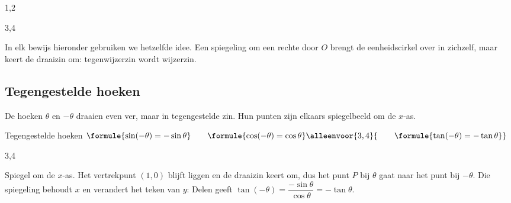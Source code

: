 \begin{alleenvoor}{1,2}
\end{alleenvoor}
\begin{alleenvoor}{3,4}

In elk bewijs hieronder gebruiken we hetzelfde idee. Een spiegeling om een rechte door $O$ brengt de eenheidscirkel over in zichzelf, maar keert de draaizin om: tegenwijzerzin wordt wijzerzin.
\end{alleenvoor}

\subsection{Tegengestelde hoeken}

De hoeken $\theta$ en $-\theta$ draaien even ver, maar in tegengestelde zin. Hun punten zijn elkaars spiegelbeeld om de $x$-as.

\begin{theorie}
\begin{stelling}{Tegengestelde hoeken}
\qquad $\formule{\sin(-\theta) = -\sin\theta} \qquad \formule{\cos(-\theta) = \cos\theta}\alleenvoor{3,4}{ \qquad \formule{\tan(-\theta) = -\tan\theta}}$
\end{stelling}
\begin{alleenvoor}{3,4}
\begin{bewijs}
Spiegel om de $x$-as. Het vertrekpunt $(1, 0)$ blijft liggen en de draaizin keert om, dus het punt $P$ bij $\theta$ gaat naar het punt bij $-\theta$. Die spiegeling behoudt $x$ en verandert het teken van $y$:
Delen geeft $\tan(-\theta) = \dfrac{-\sin\theta}{\cos\theta} = -\tan\theta$.
\end{bewijs}
\end{alleenvoor}
\end{theorie}

